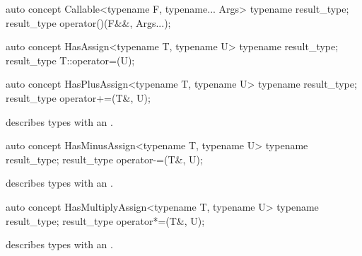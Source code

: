 \documentclass[american,twoside]{book}
\begin{document}
\begin{itemdescr}
\pnum
{}
\end{itemdescr}

\begin{itemdecl}
auto concept Callable<typename F, typename... Args> {
  typename result_type;
  result_type operator()(F&&, Args...);
}
\end{itemdecl}

\begin{itemdescr}
\pnum 
{}
\end{itemdescr}

\begin{itemdecl}
auto concept HasAssign<typename T, typename U> {
  typename result_type;
  result_type T::operator=(U);
}
\end{itemdecl}

\begin{itemdescr}
\pnum
{}
\end{itemdescr}

\begin{itemdecl}
auto concept HasPlusAssign<typename T, typename U> {
  typename result_type;
  result_type operator+=(T&, U);
}
\end{itemdecl}

\begin{itemdescr}
\pnum
\mbox{\reallynote} describes types with an \mbox{}.
\end{itemdescr}

\begin{itemdecl}
auto concept HasMinusAssign<typename T, typename U> {
  typename result_type;
  result_type operator-=(T&, U);
}
\end{itemdecl}

\begin{itemdescr}
\pnum
\mbox{\reallynote} describes types with an \mbox{}.
\end{itemdescr}

\begin{itemdecl}
auto concept HasMultiplyAssign<typename T, typename U> {
  typename result_type;
  result_type operator*=(T&, U);
}
\end{itemdecl}

\begin{itemdescr}
\pnum
\mbox{\reallynote} describes types with an \mbox{}.
\end{itemdescr}
\end{document}

